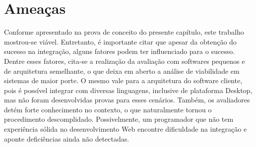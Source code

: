 \section{Ameaças}\label{ameacas}  	%


Conforme apresentado na prova de conceito do presente capítulo, este trabalho mostrou-se viável.
Entretanto, é importante citar que apesar da obtenção do sucesso na integração, alguns fatores podem ter influenciado para o sucesso. Dentre esses fatores, cita-se a realização da avaliação com softwares pequenos e de arquitetura semelhante, o que deixa em aberto a análise de viabilidade em sistemas de maior porte. 
O mesmo vale para a arquitetura do software cliente, pois é possível integrar com diversas linguagens, inclusive de plataforma Desktop, mas não foram desenvolvidas provas para esses cenários.
Também, os avaliadores detém forte conhecimento no contexto, o que naturalmente tornou o procedimento descomplidado. Possivelmente, um programador que não tem experiência sólida no desenvolvimento Web encontre dificuldade na integração e aponte deficiências ainda não detectadas.
